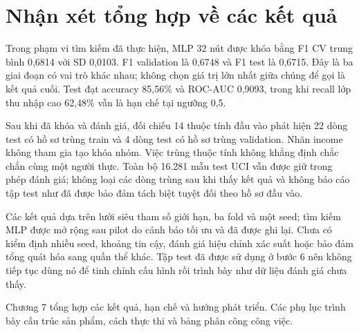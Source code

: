 \section{Nhận xét tổng hợp về các kết quả}
\label{sec:6_7}
Trong phạm vi tìm kiếm đã thực hiện, MLP 32 nút được khóa bằng F1 CV trung bình 0,6814 với SD 0,0103. F1 validation là 0,6748 và F1 test là 0,6715. Đây là ba giai đoạn có vai trò khác nhau; không chọn giá trị lớn nhất giữa chúng để gọi là kết quả cuối. Test đạt accuracy 85,56\% và ROC-AUC 0,9093, trong khi recall lớp thu nhập cao 62,48\% vẫn là hạn chế tại ngưỡng 0,5.

Sau khi đã khóa và đánh giá, đối chiếu 14 thuộc tính đầu vào phát hiện 22 dòng test có hồ sơ trùng train và 4 dòng test có hồ sơ trùng validation. Nhãn income không tham gia tạo khóa nhóm. Việc trùng thuộc tính không khẳng định chắc chắn cùng một người thực. Toàn bộ 16.281 mẫu test UCI vẫn được giữ trong phép đánh giá; không loại các dòng trùng sau khi thấy kết quả và không báo cáo tập test như đã được bảo đảm tách biệt tuyệt đối theo hồ sơ đầu vào.

Các kết quả dựa trên lưới siêu tham số giới hạn, ba fold và một seed; tìm kiếm MLP được mở rộng sau pilot do cảnh báo tối ưu và đã được ghi lại. Chưa có kiểm định nhiều seed, khoảng tin cậy, đánh giá hiệu chỉnh xác suất hoặc bảo đảm tổng quát hóa sang quần thể khác. Tập test đã được sử dụng ở bước 6 nên không tiếp tục dùng nó để tinh chỉnh cấu hình rồi trình bày như dữ liệu đánh giá chưa thấy.

Chương 7 tổng hợp các kết quả, hạn chế và hướng phát triển. Các phụ lục trình bày cấu trúc sản phẩm, cách thực thi và bảng phân công công việc.
